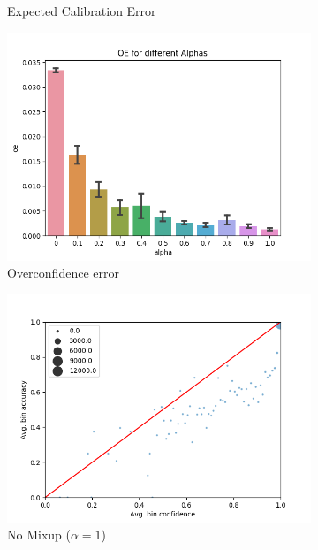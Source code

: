 \documentclass{article}
\begin{document}
\begin{figure}[h]
\begin{subfigure}[b]{0.31\textwidth}
         \caption{Expected Calibration Error}
     \end{subfigure}
     \begin{subfigure}[b]{0.31\textwidth}
         \centering
         \includegraphics[width=\textwidth]{images/fmnist/oeValpha.png}
         \caption{Overconfidence error}
     \end{subfigure}
     \begin{subfigure}[b]{0.31\textwidth}
         \centering
         \noindent\includegraphics[width=\textwidth]{images/fmnist/scatterplot_0.png}
         \caption{No Mixup ($\alpha=1$)}
     \end{subfigure}
     \begin{subfigure}[b]{0.31\textwidth}

\end{subfigure}
\end{figure}
\end{document}
